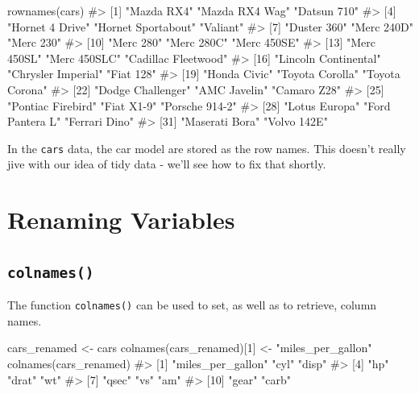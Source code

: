 \documentclass[
  letterpaper,
  DIV=11,
  numbers=noendperiod]{scrreprt}
\newenvironment{Shaded}{\begin{snugshade}}{\end{snugshade}}
\newcommand{\CommentTok}[1]{\textcolor[rgb]{0.37,0.37,0.37}{#1}}
\newcommand{\DecValTok}[1]{\textcolor[rgb]{0.68,0.00,0.00}{#1}}
\newcommand{\FunctionTok}[1]{\textcolor[rgb]{0.28,0.35,0.67}{#1}}
\newcommand{\NormalTok}[1]{\textcolor[rgb]{0.00,0.23,0.31}{#1}}
\newcommand{\OtherTok}[1]{\textcolor[rgb]{0.00,0.23,0.31}{#1}}
\newcommand{\StringTok}[1]{\textcolor[rgb]{0.13,0.47,0.30}{#1}}
\begin{document}
\begin{Shaded}
\begin{Highlighting}[]
\FunctionTok{rownames}\NormalTok{(cars)}
\CommentTok{\#\textgreater{}  [1] "Mazda RX4"           "Mazda RX4 Wag"       "Datsun 710"         }
\CommentTok{\#\textgreater{}  [4] "Hornet 4 Drive"      "Hornet Sportabout"   "Valiant"            }
\CommentTok{\#\textgreater{}  [7] "Duster 360"          "Merc 240D"           "Merc 230"           }
\CommentTok{\#\textgreater{} [10] "Merc 280"            "Merc 280C"           "Merc 450SE"         }
\CommentTok{\#\textgreater{} [13] "Merc 450SL"          "Merc 450SLC"         "Cadillac Fleetwood" }
\CommentTok{\#\textgreater{} [16] "Lincoln Continental" "Chrysler Imperial"   "Fiat 128"           }
\CommentTok{\#\textgreater{} [19] "Honda Civic"         "Toyota Corolla"      "Toyota Corona"      }
\CommentTok{\#\textgreater{} [22] "Dodge Challenger"    "AMC Javelin"         "Camaro Z28"         }
\CommentTok{\#\textgreater{} [25] "Pontiac Firebird"    "Fiat X1{-}9"           "Porsche 914{-}2"      }
\CommentTok{\#\textgreater{} [28] "Lotus Europa"        "Ford Pantera L"      "Ferrari Dino"       }
\CommentTok{\#\textgreater{} [31] "Maserati Bora"       "Volvo 142E"}
\end{Highlighting}
\end{Shaded}

In the \texttt{cars} data, the car model are stored as the row names.
This doesn't really jive with our idea of tidy data - we'll see how to
fix that shortly.

\section{Renaming Variables}\label{renaming-variables}

\subsection{\texorpdfstring{\texttt{colnames()}}{colnames()}}\label{colnames}

The function \texttt{colnames()} can be used to set, as well as to
retrieve, column names.

\begin{Shaded}
\begin{Highlighting}[]
\NormalTok{cars\_renamed }\OtherTok{\textless{}{-}}\NormalTok{ cars }
\FunctionTok{colnames}\NormalTok{(cars\_renamed)[}\DecValTok{1}\NormalTok{] }\OtherTok{\textless{}{-}} \StringTok{"miles\_per\_gallon"}
\FunctionTok{colnames}\NormalTok{(cars\_renamed)}
\CommentTok{\#\textgreater{}  [1] "miles\_per\_gallon" "cyl"              "disp"            }
\CommentTok{\#\textgreater{}  [4] "hp"               "drat"             "wt"              }
\CommentTok{\#\textgreater{}  [7] "qsec"             "vs"               "am"              }
\CommentTok{\#\textgreater{} [10] "gear"             "carb"}
\end{Highlighting}
\end{Shaded}
\end{document}
